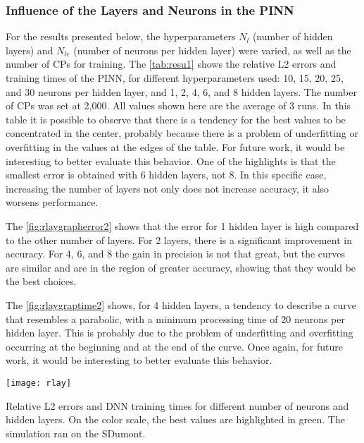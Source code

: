 \subsubsection{Influence of the Layers and Neurons in the PINN}

For the results presented below, the hyperparameters $N_{l}$ (number of hidden layers) and $N_{le}$ (number of neurons per hidden layer) were varied, as well as the number of CPs for training. The \autoref{tab:resu1} shows the relative L2 errors and training times of the PINN, for different hyperparameters used: 10, 15, 20, 25, and 30 neurons per hidden layer, and 1, 2, 4, 6, and 8 hidden layers. The number of CPs was set at 2,000. All values shown here are the average of 3 runs. In this table it is possible to observe that there is a tendency for the best values to be concentrated in the center, probably because there is a problem of underfitting or overfitting in the values at the edges of the table. For future work, it would be interesting to better evaluate this behavior. One of the highlights is that the smallest error is obtained with 6 hidden layers, not 8. In this specific case, increasing the number of layers not only does not increase accuracy, it also worsens performance.

The \autoref{fig:rlaygrapherror2} shows that the error for 1 hidden layer is high compared to the other number of layers. For 2 layers, there is a significant improvement in accuracy. For 4, 6, and 8 the gain in precision is not that great, but the curves are similar and are in the region of greater accuracy, showing that they would be the best choices.

The \autoref{fig:rlaygraptime2} shows, for 4 hidden layers, a tendency to describe a curve that resembles a parabolic, with a minimum processing time of 20 neurons per hidden layer. This is probably due to the problem of underfitting and overfitting occurring at the beginning and at the end of the curve. Once again, for future work, it would be interesting to better evaluate this behavior.

\begin{table}[htb]\centering
\texttt{[image: rlay]}
\vspace{1em}
\caption{Relative L2 errors and DNN training times for different number of neurons and hidden layers. On the color scale, the best values are highlighted in green. The simulation ran on the SDumont.}
\label{tab:resu1}
\end{table}

